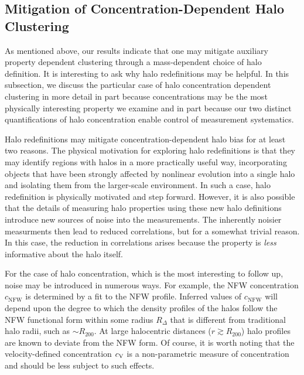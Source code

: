 \documentclass[usenatbib,fleqn]{mnras}
\begin{document}
\subsection{Mitigation of Concentration-Dependent Halo Clustering}

As mentioned above, our results indicate that one may mitigate auxiliary 
property dependent clustering through a mass-dependent choice of halo 
definition. It is interesting to ask why halo redefinitions may be 
helpful. In this subsection, we discuss the particular case of halo 
concentration dependent clustering in more detail in part because concentrations may be the most physically interesting property we examine and 
in part because our two distinct quantifications of halo concentration enable 
control of measurement systematics. 

Halo redefinitions may mitigate concentration-dependent halo bias for at least two reasons. The physical motivation for exploring halo redefinitions is that they may identify regions with halos in a more practically useful way, incorporating objects that have been strongly affected by nonlinear evolution into a single halo and isolating them from the larger-scale environment. In such a case, halo redefinition is physically motivated and step forward. However, it is also possible that the details of measuring halo properties using these new halo definitions introduce new sources of noise into the 
measurements. The inherently noisier measurments then lead to reduced 
correlations, but for a somewhat trivial reason. In this case, the 
reduction in correlations arises because the property is {\em less} 
informative about the halo itself. 

For the case of halo concentration, which is the most interesting to 
follow up, noise may be introduced in numerous ways. For example, 
the NFW concentration $c_{\mathrm{NFW}}$ is determined by a fit to the 
NFW profile. Inferred values of $c_{\mathrm{NFW}}$ will depend upon 
the degree to which the density profiles of the halos follow the NFW 
functional form within some radius $R_{\Delta}$ that is different from 
traditional halo radii, such as $\sim R_{200}$. At large halocentric 
distances ($r \gtrsim R_{200}$) halo profiles are known to deviate 
from the NFW form. Of course, it is worth noting that the 
velocity-defined concentration $c_{\rm V}$ is a non-parametric measure of concentration and should be less subject to such effects. 
\end{document}
